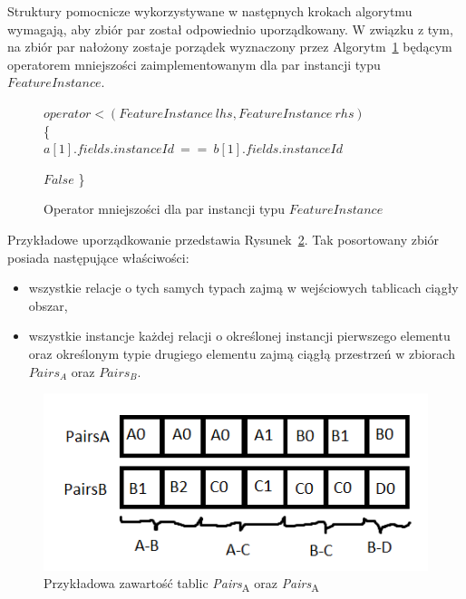 \documentclass[12pt]{article}
\begin{document}
Struktury pomocnicze wykorzystywane w następnych krokach algorytmu wymagają, aby zbiór par został odpowiednio uporządkowany. W związku z tym, na zbiór par nałożony zostaje porządek wyznaczony przez Algorytm~\ref{alg:FeatureInstancePair-operator} będącym operatorem mniejszości zaimplementowanym dla par instancji typu $ FeatureInstance $.

\begin{figure}[H]
\begin{algorithm}[H]
$operator<(FeatureInstance\ lhs,FeatureInstance\ rhs) $\\
\{\\
   {
       {
	  	 {
	  		\Return $ a[1].fields.instanceId\ ==\ b[1].fields.instanceId $ \;
	  	}	
	  }
  }
  
  \Return $ False $ \;
\}

\caption{Operator mniejszości dla par instancji typu $ FeatureInstance $}
\label{alg:FeatureInstancePair-operator}
\end{algorithm}
\end{figure}

Przykładowe uporządkowanie przedstawia Rysunek~\ref{fig:pairs_content}. Tak posortowany zbiór posiada następujące właściwości:
\begin{itemize}
\item wszystkie relacje o tych samych typach zajmą w wejściowych tablicach ciągły obszar,
\item wszystkie instancje każdej relacji o określonej instancji pierwszego elementu oraz określonym typie drugiego elementu zajmą ciągłą przestrzeń w zbiorach $ Pairs_{A} $ oraz $ Pairs_{B} $.
\end{itemize}

  
\begin{figure}[H]
\centering
\includegraphics{sortAttr_insTable}
\caption{Przykładowa zawartość tablic \textit{Pairs}\textsubscript{A} oraz \textit{Pairs}\textsubscript{A}}
\label{fig:pairs_content}
\end{figure}
\end{document}
